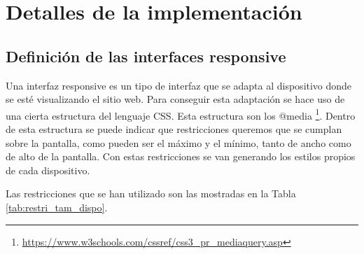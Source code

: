 \chapter{Detalles de la implementación}

\section{Definición de las interfaces responsive} \label{sec:def_interfaces_responsive}

Una interfaz responsive es un tipo de interfaz que se adapta al dispositivo donde se esté visualizando el sitio web. Para conseguir esta adaptación se hace uso de una cierta estructura del lenguaje CSS. Esta estructura son los @media \footnote{\url{https://www.w3schools.com/cssref/css3_pr_mediaquery.asp}}. Dentro de esta estructura se puede indicar que restricciones queremos que se cumplan sobre la pantalla, como pueden ser el máximo y el mínimo, tanto de ancho como de alto de la pantalla. Con estas restricciones se van generando los estilos propios de cada dispositivo.

Las restricciones que se han utilizado son las mostradas en la Tabla \ref{tab:restri_tam_dispo}.

\begin{table}[h]
\centering
{}
\caption{Restricciones de tamaño de pantalla para los dispositivos}
\label{tab:restri_tam_dispo}
\end{table}


